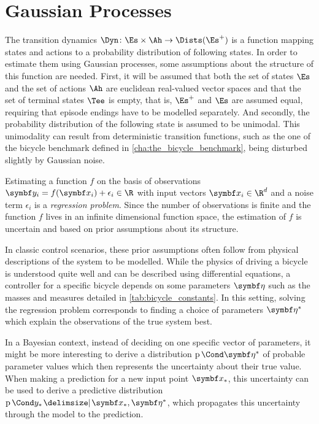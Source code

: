 \chapter{Gaussian Processes}
\label{cha:gaussian_processes}
The transition dynamics $\Dyn \colon \Es \times \Ah \to \Dists(\Es^+)$ is a function mapping states and actions to a probability distribution of following states.
In order to estimate them using Gaussian processes, some assumptions about the structure of this function are needed.
First, it will be assumed that both the set of states $\Es$ and the set of actions $\Ah$ are euclidean real-valued vector spaces and that the set of terminal states $\Tee$ is empty, that is, $\Es^+$ and $\Es$ are assumed equal, requiring that episode endings have to be modelled separately.
And secondly, the probability distribution of the following state is assumed to be unimodal.
This unimodality can result from deterministic transition functions, such as the one of the bicycle benchmark defined in \cref{cha:the_bicycle_benchmark}, being disturbed slightly by Gaussian noise.

Estimating a function $f$ on the basis of observations $\mat{y_i} = f(\mat{x_i}) + \epsilon_i \in \R$ with input vectors $\mat{x_i} \in \R^d$ and a noise term $\epsilon_i$ is a \emph{regression problem}.
Since the number of observations is finite and the function $f$ lives in an infinite dimensional function space, the estimation of $f$ is uncertain and based on prior assumptions about its structure.

In classic control scenarios, these prior assumptions often follow from physical descriptions of the system to be modelled.
While the physics of driving a bicycle is understood quite well and can be described using differential equations, a controller for a specific bicycle depends on some parameters $\rv{\eta}$ such as the masses and measures detailed in \cref{tab:bicycle_constants}.
In this setting, solving the regression problem corresponds to finding a choice of parameters $\rv{\eta^\ast}$ which explain the observations of the true system best.

In a Bayesian context, instead of deciding on one specific vector of parameters, it might be more interesting to derive a distribution $\Prob{\rv{\eta^\ast}}$ of probable parameter values which then represents the uncertainty about their true value.
When making a prediction for a new input point $\mat{x_\ast}$, this uncertainty can be used to derive a predictive distribution $\Prob{y_\ast \given \mat{x_\ast}, \mat{\eta^\ast}}$, which propagates this uncertainty through the model to the prediction.

